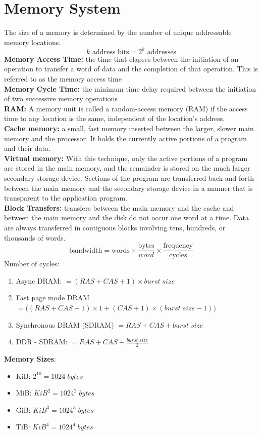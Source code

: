 \documentclass[10pt]{article}
\begin{document}
\section*{Memory System}
The size of a memory is determined by the number of unique addressable memory locations.
$$k \text{ address bits} = 2^k \text{ addresses}$$
\textbf{Memory Access Time:} the time that elapses between the initiation of an operation to transfer a word of data and the completion of that operation. This is referred to as the memory access time\\
\textbf{Memory Cycle Time:} the minimum time delay required between the initiation of two successive memory operations\\
\textbf{RAM:} A memory unit is called a random-access memory (RAM) if the access time to any location is the same, independent of the location’s address. \\
\textbf{Cache memory:}  a small, fast memory inserted between the larger, slower main memory and the processor. It holds the currently active portions of a program and their data.\\
\textbf{Virtual memory:} With this technique, only the active portions of a program are stored in the main memory, and the remainder is stored on the much larger secondary storage device. Sections of the program are transferred back and forth between the main memory and the secondary storage device in a manner that is transparent to the application program.\\
\textbf{Block Transfers:} transfers between the main memory and the cache and between the main memory and the disk do not occur one word at a time. Data are always transferred in contiguous blocks involving tens, hundreds, or thousands of words.
$$\text{bandwidth} = \text{words} \times \frac{\text{bytes}}{word} \times \frac{\text{frequency}}{\text{cycles}}$$
Number of cycles:
\begin{enumerate}
    \item Async DRAM: $= (RAS + CAS + 1) \times burst\; size$
    \item Fast page mode DRAM $= \Big((RAS + CAS + 1)\times 1 + (CAS + 1) \times (burst\; size -1)\Big)$
    \item Synchronous DRAM (SDRAM) $= {RAS + CAS + burst\; size}$
    \item DDR - SDRAM: $=RAS + CAS + \frac{burst\; size}{2}$
\end{enumerate}
\textbf{Memory Sizes}:
\begin{itemize}
    \item KiB: $2^{10} = 1024\; bytes$
    \item MiB: $KiB^2 = 1024^2\; bytes$
    \item GiB: $KiB^3 = 1024^3\; bytes$
    \item TiB: $KiB^4 = 1024^4\; bytes$
\end{itemize}
\end{document}
